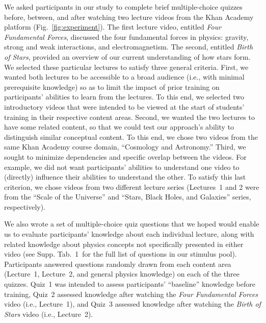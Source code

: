 \documentclass[10pt]{article}
\newcommand{\questions}{1}
\begin{document}
We asked participants in our study to complete brief multiple-choice quizzes
before, between, and after watching two lecture videos from the Khan
Academy~\citep{Khan04} platform (Fig.~\ref{fig:experiment}). The first lecture
video, entitled \textit{Four Fundamental Forces}, discussed the four
fundamental forces in physics: gravity, strong and weak interactions, and
electromagnetism. The second, entitled \textit{Birth of Stars}, provided an
overview of our current understanding of how stars form. We selected these
particular lectures to satisfy three general criteria. First, we wanted both
lectures to be accessible to a broad audience (i.e., with minimal prerequisite
knowledge) so as to limit the impact of prior training on participants'
abilities to learn from the lectures. To this end, we selected two introductory
videos that were intended to be viewed at the start of students' training in
their respective content areas. Second, we wanted the two lectures to have some
related content, so that we could test our approach's ability to distinguish
similar conceptual content. To this end, we chose two videos from the same Khan
Academy course domain, ``Cosmology and Astronomy.'' Third, we sought to
minimize dependencies and specific overlap between the videos. For example, we
did not want participants' abilities to understand one video to (directly)
influence their abilities to understand the other. To satisfy this last
criterion, we chose videos from two different lecture series (Lectures~1 and 2
were from the ``Scale of the Universe'' and ``Stars, Black Holes, and
Galaxies'' series, respectively).

We also wrote a set of multiple-choice quiz questions that we hoped would
enable us to evaluate participants' knowledge about each individual lecture,
along with related knowledge about physics concepts not specifically presented
in either video (see Supp. Tab.~\questions~for the full list of questions in
our stimulus pool). Participants answered questions randomly drawn from each
content area (Lecture~1, Lecture~2, and general physics knowledge) on each of
the three quizzes. Quiz~1 was intended to assess participants' ``baseline''
knowledge before training, Quiz~2 assessed knowledge after watching the
\textit{Four Fundamental Forces} video (i.e., Lecture~1), and Quiz~3 assessed
knowledge after watching the \textit{Birth of Stars} video (i.e., Lecture~2).
\end{document}
